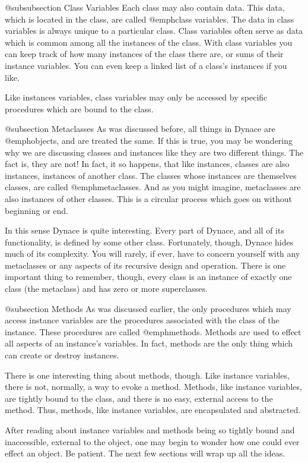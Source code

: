 @subsubsection Class Variables
Each class may also contain data. This data, which is located in the class,
are called @emph{class variables}.  The data in class variables is always
unique to a particular class.  Class variables often serve as data which
is common among all the instances of the class.  With class variables
you can keep track of how many instances of the class there are, or
sums of their instance variables.  You can even keep a linked list of
a class's instances if you like.

Like instances variables, class variables may only be accessed by
specific procedures which are bound to the class.

@subsection Metaclasses
As was discussed before, all things in Dynace are @emph{objects}, and
are treated the same.  If this is true, you may be wondering why we are
discussing classes and instances like they are two different things.
The fact is, they are not!  In fact, it so happens, that like instances,
classes are also instances, instances of another class.  The classes
whose instances are themselves classes, are called @emph{metaclasses}.
And as you might imagine, metaclasses are also instances of other
classes.  This is a circular process which goes on without beginning or
end.

In this sense Dynace is quite interesting.  Every part of Dynace, and all of
its functionality, is defined by some other class.  Fortunately, though,
Dynace hides much of its complexity.  You will rarely, if ever, have to
concern yourself with any metaclasses or any aspects of its recursive
design and operation.  There is one important thing to remember, though,
every class is an instance of exactly one class (the metaclass) and has
zero or more superclasses.

@subsection Methods
As was discussed earlier, the only procedures which may access instance
variables are the procedures associated with the class of the instance.
These procedures are called @emph{methods}.  Methods are used to effect
all aspects of an instance's variables.  In fact, methods are the only
thing which can create or destroy instances.

There is one interesting thing about methods, though.  Like instance
variables, there is not, normally, a way to evoke a method.  Methods,
like instance variables, are tightly bound to the class, and there is
no easy, external access to the method.  Thus, methods, like instance
variables, are encapsulated and abstracted.

After reading about instance variables and methods being so tightly
bound and inaccessible, external to the object, one may begin to wonder
how one could ever effect an object.  Be patient.  The next few sections
will wrap up all the ideas.

